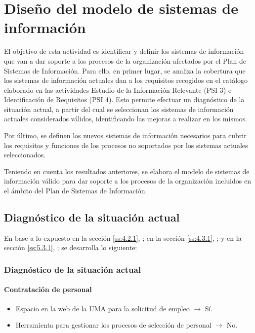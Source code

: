 \documentclass[11pt,a4paper,spanish,twoside]{book}
\begin{document}
\chapter{Diseño del modelo de sistemas de información}
El objetivo de esta actividad es identificar y definir los sistemas de
información que van a dar soporte a los procesos de la organización afectados
por el Plan de Sistemas de Información. Para ello, en primer lugar, se
analiza la cobertura que los sistemas de información actuales dan a los
requisitos recogidos en el catálogo elaborado en las actividades Estudio de
la Información Relevante (PSI 3) e Identificación de Requisitos (PSI 4). Esto
permite efectuar un diagnóstico de la situación actual, a partir del cual
se seleccionan los sistemas de información actuales considerados válidos,
identificando las mejoras a realizar en los mismos. 

Por último, se definen los nuevos sistemas de información necesarios para
cubrir los requisitos y funciones de los procesos no soportados por los
sistemas actuales seleccionados. 

Teniendo en cuenta los resultados anteriores, se elabora el modelo de
sistemas de información válido para dar soporte a los procesos de la
organización incluidos en el ámbito del Plan de Sistemas de Información. 

\section{Diagnóstico de la situación actual}

En base a lo expuesto 
en la sección \vref{ss:4.2.1}, \emph{}; 
en la sección \vref{ss:4.3.1}, \emph{}; y 
en la sección \vref{ss:5.3.1}, \emph{};
se desarrolla lo siguiente:

\subsection{Diagnóstico de la situación actual} \label{ss:6.1.1}
\subsubsection{Contratación de personal}
\begin{itemize}
\item Espacio en la web de la UMA para la solicitud de empleo $\to$ Sí.
\item Herramienta para gestionar los procesos de selección de personal $\to$ No.
\end{itemize}
\end{document}
